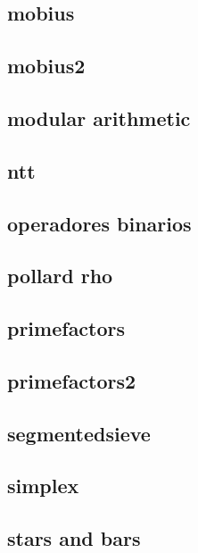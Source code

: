 \subsection{mobius}
\raggedbottom
\hrulefill
\subsection{mobius2}
\raggedbottom
\hrulefill
\subsection{modular arithmetic}
\raggedbottom
\hrulefill
\subsection{ntt}
\raggedbottom
\hrulefill
\subsection{operadores binarios}
\raggedbottom
\hrulefill
\subsection{pollard rho}
\raggedbottom
\hrulefill
\subsection{primefactors}
\raggedbottom
\hrulefill
\subsection{primefactors2}
\raggedbottom
\hrulefill
\subsection{segmentedsieve}
\raggedbottom
\hrulefill
\subsection{simplex}
\raggedbottom
\hrulefill
\subsection{stars and bars}
\raggedbottom
\hrulefill
